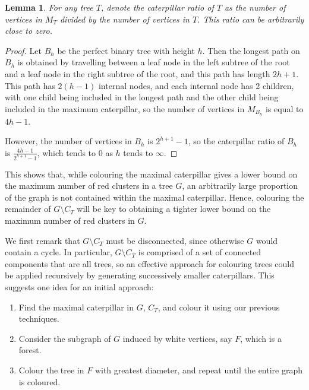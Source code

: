 \documentclass{mpaper}
\newtheorem{lemma}{Lemma}[section]
\begin{document}
\begin{lemma}
  \label{lem/ratio-tends-to-zero}
  For any tree $T$, denote the \emph{caterpillar ratio of $T$} as the number of vertices in $M_T$ divided by the number of vertices in $T$. This ratio can be arbitrarily close to zero.
\end{lemma}

\begin{proof}
Let $B_h$ be the perfect binary tree with height $h$. Then the longest path on $B_h$ is obtained by travelling between a leaf node in the left subtree of the root and a leaf node in the right subtree of the root, and this path has length $2h+1$. This path has $2(h-1)$ internal nodes, and each internal node has 2 children, with one child being included in the longest path and the other child being included in the maximum caterpillar, so the number of vertices in $M_{B_h}$ is equal to $4h-1$.

However, the number of vertices in $B_h$ is $2^{h+1}-1$, so the caterpillar ratio of $B_h$ is $\frac{4h-1}{2^{h+1}-1}$, which tends to $0$ as $h$ tends to $\infty$.
\end{proof}


This shows that, while colouring the maximal caterpillar gives a lower bound on the maximum number of red clusters in a tree $G$, an arbitrarily large proportion of the graph is not contained within the maximal caterpillar. Hence, colouring the remainder of $G \setminus C_T$ will be key to obtaining a tighter lower bound on the maximum number of red clusters in $G$.

We first remark that $G \setminus C_T$ must be disconnected, since otherwise $G$ would contain a cycle. In particular, $G \setminus C_T$ is comprised of a set of connected components that are all trees, so an effective approach for colouring trees could be applied recursively by generating successively smaller caterpillars. This suggests one idea for an initial approach:

\begin{enumerate}
  \item Find the maximal caterpillar in $G$, $C_T$, and colour it using our previous techniques.
  \item Consider the subgraph of $G$ induced by white vertices, say $F$, which is a forest.
  \item Colour the tree in $F$ with greatest diameter, and repeat until the entire graph is coloured.
\end{enumerate}
\end{document}

